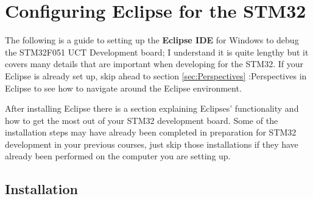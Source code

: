 \section{Configuring Eclipse for the STM32}
\label{sec:eclipseconfig}
The following is a guide to setting up the \textbf{Eclipse IDE} for Windows to debug the STM32F051 UCT Development board; I understand it is quite lengthy but it covers many details that are important when developing for the STM32. If your Eclipse is already set up, skip ahead to section \ref{sec:Perspectives} :Perspectives in Eclipse  to see how to navigate around the Eclipse environment.
\par
After installing Eclipse there is a section explaining Eclipses' functionality and how to get the most out of your STM32 development board. Some of the installation steps may have already been completed in preparation for STM32 development in your previous courses, just skip those installations if they have already been performed on the computer you are setting up.
\subsection{Installation}
